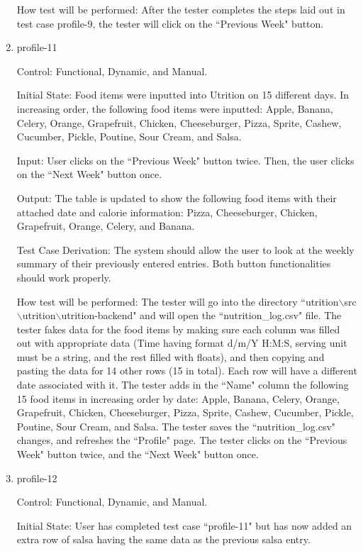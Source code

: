 \documentclass[12pt, titlepage]{article}
\begin{document}
\begin{enumerate}
		How test will be performed: After the tester completes the steps laid out in test case profile-9, the tester will click on the ``Previous Week" button.
		
		\item{profile-11\\}
		
		Control: Functional, Dynamic, and Manual.
		
		Initial State: Food items were inputted into Utrition on 15 different days. In increasing order, the following food items were inputted: Apple, Banana, Celery, Orange, Grapefruit, Chicken, Cheeseburger, Pizza, Sprite, Cashew, Cucumber, Pickle, Poutine, Sour Cream, and Salsa.
		
		Input: User clicks on the ``Previous Week" button twice. Then, the user clicks on the ``Next Week" button once.
		
		Output: The table is updated to show the following food items with their attached date and calorie information: Pizza, Cheeseburger, Chicken, Grapefruit, Orange, Celery, and Banana.
		
		Test Case Derivation: The system should allow the user to look at the weekly summary of their previously entered entries. Both button functionalities should work properly.
		
		How test will be performed: The tester will go into the directory ``utrition$\backslash$src$\backslash$utrition$\backslash$utrition-backend" and will open the ``nutrition\_log.csv" file. The tester fakes data for the food items by making sure each column was filled out with appropriate data (Time having format d/m/Y H:M:S, serving unit must be a string, and the rest filled with floats), and then copying and pasting the data for 14 other rows (15 in total). Each row will have a different date associated with it. The tester adds in the ``Name" column the following 15 food items in increasing order by date: Apple, Banana, Celery, Orange, Grapefruit, Chicken, Cheeseburger, Pizza, Sprite, Cashew, Cucumber, Pickle, Poutine, Sour Cream, and Salsa. The tester saves the ``nutrition\_log.csv" changes, and refreshes the ``Profile" page. The tester clicks on the ``Previous Week" button twice, and the ``Next Week" button once.
		
		\item{profile-12\\}
		
		Control: Functional, Dynamic, and Manual.
		
		Initial State:  User has completed test case ``profile-11" but has now added an extra row of salsa having the same data as the previous salsa entry.
		

\end{enumerate}
\end{document}
